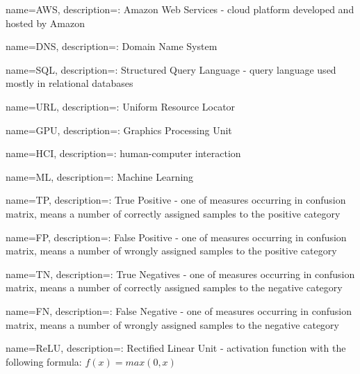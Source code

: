 {
name=AWS,
description={: Amazon Web Services - cloud platform developed and hosted by Amazon}
}

{
name=DNS,
description={: Domain Name System}
}

{
name=SQL,
description={: Structured Query Language - query language used mostly in relational databases}
}

{
name=URL,
description={: Uniform Resource Locator}
}

{
name=GPU,
description={: Graphics Processing Unit}
}

{
name=HCI,
description={: human-computer interaction}
}

{
name=ML,
description={: Machine Learning}
}

{
name=TP,
description={: True Positive - one of measures occurring in confusion matrix, means a number of correctly assigned samples to the positive category}
}

{
name=FP,
description={: False Positive - one of measures occurring in confusion matrix, means a number of wrongly assigned samples to the positive category}
}

{
name=TN,
description={: True Negatives - one of measures occurring in confusion matrix, means a number of correctly assigned samples to the negative category}
}

{
name=FN,
description={: False Negative - one of measures occurring in confusion matrix, means a number of wrongly assigned samples to the negative category}
}

{
name=ReLU,
description={: Rectified Linear Unit - activation function with the following formula: $f(x)=max(0, x)$}
}

